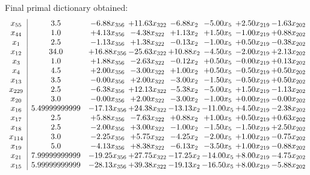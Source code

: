 \documentclass[8pt]{article}
\begin{document}
 Final primal dictionary obtained: 
\[\begin{array}{c| c c@{\hskip 2pt} c@{\hskip 2pt} c@{\hskip 2pt} c@{\hskip 2pt} c@{\hskip 2pt} c@{\hskip 2pt} }
 x_{55}   &  3.5 & -6.88 x_{356} & + 11.63 x_{322} & -6.88 x_{2} & -5.00 x_{5} & +  2.50 x_{219} & -1.63 x_{202}\\
 x_{44}   &  1.0 & +  4.13 x_{356} & -4.38 x_{322} & +  1.13 x_{2} & +  1.50 x_{5} & -1.00 x_{219} & +  0.88 x_{202}\\
 x_{1}   &  2.5 & -1.13 x_{356} & +  1.38 x_{322} & -0.13 x_{2} & -1.00 x_{5} & +  0.50 x_{219} & -0.38 x_{202}\\
 x_{12}   &  34.0 & + 16.88 x_{356} & -25.63 x_{322} & + 10.88 x_{2} & -4.50 x_{5} & -2.00 x_{219} & +  2.13 x_{202}\\
 x_{3}   &  1.0 & +  1.88 x_{356} & -2.63 x_{322} & -0.12 x_{2} & +  0.50 x_{5} & -0.00 x_{219} & +  0.13 x_{202}\\
 x_{4}   &  4.5 & +  2.00 x_{356} & -3.00 x_{322} & +  1.00 x_{2} & +  0.50 x_{5} & -0.50 x_{219} & +  0.50 x_{202}\\
 x_{13}   &  3.5 & -0.00 x_{356} & +  2.00 x_{322} & -3.00 x_{2} & -1.50 x_{5} & -0.50 x_{219} & +  0.50 x_{202}\\
 x_{229}   &  2.5 & -6.38 x_{356} & + 12.13 x_{322} & -5.38 x_{2} & -5.00 x_{5} & +  1.50 x_{219} & -1.13 x_{202}\\
 x_{20}   &  3.0 & -0.00 x_{356} & +  2.00 x_{322} & -3.00 x_{2} & -1.00 x_{5} & +  0.00 x_{219} & -0.00 x_{202}\\
 x_{16}   &  5.49999999999 & -17.13 x_{356} & + 24.38 x_{322} & -13.13 x_{2} & -11.00 x_{5} & +  4.50 x_{219} & -2.38 x_{202}\\
 x_{17}   &  2.5 & +  5.88 x_{356} & -7.63 x_{322} & +  0.88 x_{2} & +  1.00 x_{5} & +  0.50 x_{219} & +  0.63 x_{202}\\
 x_{18}   &  2.5 & -2.00 x_{356} & +  3.00 x_{322} & -1.00 x_{2} & -1.50 x_{5} & -1.50 x_{219} & +  2.50 x_{202}\\
 x_{114}   &  3.0 & -2.25 x_{356} & +  5.75 x_{322} & -4.25 x_{2} & -2.00 x_{5} & +  1.00 x_{219} & -0.75 x_{202}\\
 x_{19}   &  5.0 & -4.13 x_{356} & +  8.38 x_{322} & -6.13 x_{2} & -3.50 x_{5} & +  1.00 x_{219} & -0.88 x_{202}\\
 x_{21}   &  7.99999999999 & -19.25 x_{356} & + 27.75 x_{322} & -17.25 x_{2} & -14.00 x_{5} & +  8.00 x_{219} & -4.75 x_{202}\\
 x_{15}   &  5.99999999999 & -28.13 x_{356} & + 39.38 x_{322} & -19.13 x_{2} & -16.50 x_{5} & +  8.00 x_{219} & -5.88 x_{202}\\

\end{array}\]
\end{document}
